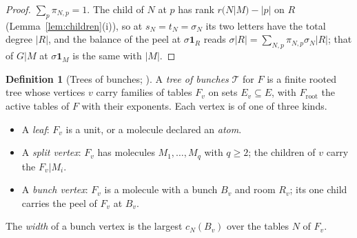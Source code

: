 \documentclass[11pt]{article}
\theoremstyle{plain}
\theoremstyle{definition}
\newtheorem{defn}[prop]{Definition}
\theoremstyle{remark}
\newcommand{\cT}{\mathcal T}
\begin{document}
\begin{proof}
$\sum_p\pi_{N,p}=1$. The child of $N$ at $p$ has rank $r(N|M)-|p|$ on $R$ (Lemma~\ref{lem:children}(i)), so at $s_N=t_N=\sigma_N$ its two letters have the total degree $|R|$, and the balance of the peel at $\sigma\mathbf 1_R$ reads $\sigma|R|=\sum_{N,p}\pi_{N,p}\sigma_N|R|$; that of $G|M$ at $\sigma\mathbf 1_M$ is the same with $|M|$.
\end{proof}

\begin{defn}[Trees of bunches; {\cite[Def.~19.7, p.~137]{F}}]\label{def:tree}
A \emph{tree of bunches} $\cT$ for $F$ is a finite rooted tree whose vertices $v$ carry families of tables $F_v$ on sets $E_v\subseteq E$, with $F_{\mathrm{root}}$ the active tables of $F$ with their exponents. Each vertex is of one of three kinds.
\begin{itemize}
\item A \emph{leaf}: $F_v$ is a unit, or a molecule declared an \emph{atom}.
\item A \emph{split vertex}: $F_v$ has molecules $M_1,\dots,M_q$ with $q\ge2$; the children of $v$ carry the $F_v|M_i$.
\item A \emph{bunch vertex}: $F_v$ is a molecule with a bunch $B_v$ and room $R_v$; its one child carries the peel of $F_v$ at $B_v$.
\end{itemize}
The \emph{width} of a bunch vertex is the largest $c_N(B_v)$ over the tables $N$ of $F_v$.
\end{defn}
\end{document}
